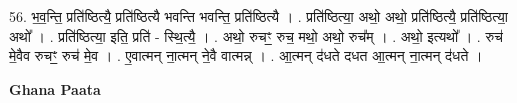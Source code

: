 \documentclass[17pt]{extarticle}
\begin{document}
56. भ॒व॒न्ति॒ प्रति॑ष्ठित्यै॒ प्रति॑ष्ठित्यै भवन्ति भवन्ति॒ प्रति॑ष्ठित्यै । . प्रति॑ष्ठित्या॒ अथो॒ अथो॒ प्रति॑ष्ठित्यै॒ प्रति॑ष्ठित्या॒ अथो᳚ । . प्रति॑ष्ठित्या॒ इति॒ प्रति॑ - स्थि॒त्यै॒ । . अथो॒ रुचꣳ॒॒ रुच॒ मथो॒ अथो॒ रुच᳚म् । . अथो॒ इत्यथो᳚ । . रुच॑ मे॒वैव रुचꣳ॒॒ रुच॑ मे॒व । . ए॒वात्मन् ना॒त्मन् ने॒वै वात्मन्न् । . आ॒त्मन् द॑धते दधत आ॒त्मन् ना॒त्मन् द॑धते । \newline

\textbf{Ghana Paata } \newline
\end{document}
